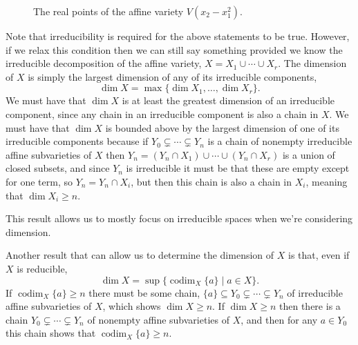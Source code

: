 \documentclass[fleqn]{NotesClass}
\DeclareMathOperator{\codim}{codim}
\begin{document}
    \begin{figure}
        \centering
        \caption[Quadratic variety.]{The real points of the affine variety \(V(x_2 - x_1^2)\).}
        \label{fig:real points of x squared}
    \end{figure}
    
    Note that irreducibility is required for the above statements to be true.
    However, if we relax this condition then we can still say something provided we know the irreducible decomposition of the affine variety, \(X = X_1 \cup \dotsb \cup X_r\).
    The dimension of \(X\) is simply the largest dimension of any of its irreducible components,
    \begin{equation}
        \dim X = \max\{\dim X_1, \dotsc, \dim X_r\}.
    \end{equation}
    We must have that \(\dim X\) is at least the greatest dimension of an irreducible component, since any chain in an irreducible component is also a chain in \(X\).
    We must have that \(\dim X\) is bounded above by the largest dimension of one of its irreducible components because if \(Y_0 \subsetneq \dotsb \subsetneq Y_n\) is a chain of nonempty irreducible affine subvarieties of \(X\) then \(Y_n = (Y_n \cap X_1) \cup \dotsb \cup (Y_n \cap X_r)\) is a union of closed subsets, and since \(Y_n\) is irreducible it must be that these are empty except for one term, so \(Y_n = Y_n \cap X_i\), but then this chain is also a chain in \(X_i\), meaning that \(\dim X_i \ge n\).
    
    This result allows us to mostly focus on irreducible spaces when we're considering dimension.
    
    Another result that can allow us to determine the dimension of \(X\) is that, even if \(X\) is reducible,
    \begin{equation}
        \dim X = \sup\{\codim_X \{a\} \mid a \in X\}.
    \end{equation}
    If \(\codim_X \{a\} \ge n\) there must be some chain, \(\{a\} \subseteq Y_0 \subsetneq \dotsb \subsetneq Y_n\) of irreducible affine subvarieties of \(X\), which shows \(\dim X \ge n\).
    If \(\dim X \ge n\) then there is a chain \(Y_0 \subsetneq \dotsb \subsetneq Y_n\) of nonempty affine subvarieties of \(X\), and then for any \(a \in Y_0\) this chain shows that \(\codim_X \{a\} \ge n\).
    
\end{document}
